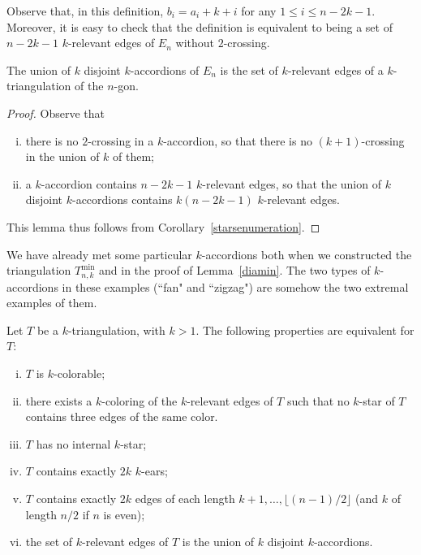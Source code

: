 \documentclass[12pt]{amsart}
\begin{document}
Observe that, in this definition, $b_i=a_i+k+i$ for any $1\le i\le n-2k-1$. Moreover, it is easy to check that the definition is equivalent to being a set of $n-2k-1$ $k$-relevant edges of $E_n$ without $2$-crossing.

\begin{lemma}
The union of $k$ disjoint $k$-accordions of $E_n$ is the set of $k$-relevant edges of a $k$-triangulation of the $n$-gon.
\end{lemma}

\begin{proof}
Observe that
\begin{enumerate}[(i)]
\item there is no $2$-crossing in a $k$-accordion, so that there is no $(k+1)$-crossing in the union of $k$ of them;
\item a $k$-accordion contains $n-2k-1$ $k$-relevant edges, so that the union of $k$ disjoint $k$-accordions contains $k(n-2k-1)$ $k$-relevant edges.
\end{enumerate}
This lemma thus follows from Corollary~\ref{starsenumeration}.
\end{proof}


We have already met some particular $k$-accordions both when we constructed the triangulation $T_{n,k}^{\min}$ and in the proof of Lemma~\ref{diamin}. The two types of $k$-accordions in these examples (``fan" and ``zigzag") are somehow the two extremal examples of them.

\begin{theorem}\label{colorable}
Let $T$ be a $k$-triangulation, with $k>1$. The following properties are equivalent for $T$:
\begin{enumerate}[(i)]
\item $T$ is $k$-colorable;
\item there exists a $k$-coloring of the $k$-relevant edges of $T$ such that no $k$-star of $T$ contains three edges of the same color.
\item $T$ has no internal $k$-star;
\item $T$ contains exactly $2k$ $k$-ears;
\item $T$ contains exactly $2k$ edges of each length $k+1,\dots, \lfloor (n-1)/2 \rfloor$ (and $k$ of length $n/2$ if $n$ is even);
\item the set of $k$-relevant edges of $T$ is the union of $k$ disjoint $k$-accordions.
\end{enumerate}
\end{theorem}
\end{document}
